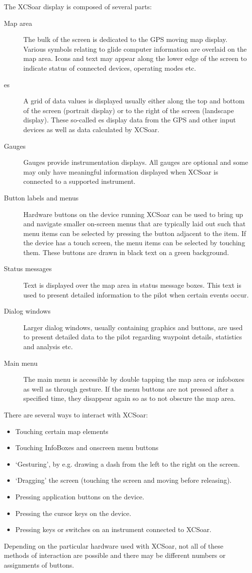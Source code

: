 \documentclass[a4paper,12pt]{refrep}
\begin{document}
The XCSoar display is composed of several parts:
\begin{description}
\item[Map area] The bulk of the screen is dedicated to the GPS moving map
display. Various symbols relating to glide computer information are overlaid 
on the map area. Icons and text may appear along the lower edge of the screen
to indicate status of connected devices, operating modes etc.
\item[{\InfoBox}es] A grid of data values is displayed usually either along
the top and bottom of the screen (portrait display) or to the right of the
screen (landscape display).  These so-called {\InfoBox}es display data from the
GPS and other input devices as well as data calculated by XCSoar.
\item[Gauges]  Gauges provide instrumentation displays. All gauges are optional
and some may only have meaningful information displayed when XCSoar is
connected to a supported instrument.
\item[Button labels and menus] Hardware buttons on the device running XCSoar
can be used to bring up and navigate smaller on-screen menus that are
typically laid out such that menu items can be selected by pressing the
button adjacent to the item.  If the device has a touch screen, the menu
items can be selected by touching them.  These buttons are drawn in black
text on a green background.
\item[Status messages] Text is displayed over the map area in status message
boxes.  This text is used to present detailed information to the pilot when
certain events occur.
\item[Dialog windows] Larger dialog windows, usually containing graphics and
buttons, are used to present detailed data to the pilot regarding waypoint
details, statistics and analysis etc.
\item[Main menu] The main menu is accessible by double tapping the map area or
infoboxes as well as through gesture. If the menu buttons are
not pressed after a specified time, they disappear again so as to not obscure the map area.
\end{description}

There are several ways to interact with XCSoar:
\begin{itemize}
\item Touching certain map elements
\item Touching InfoBoxes and onscreen menu buttons
\item `Gesturing', by e.g. drawing a dash from the left to the right on the screen.
\item `Dragging' the screen (touching the screen and moving before releasing).
\item Pressing application buttons on the device.
\item Pressing the cursor keys on the device.
\item Pressing keys or switches on an instrument connected to XCSoar.
\end{itemize}
Depending on the particular hardware used with XCSoar, not all of these methods
of interaction are possible and there may be different numbers or assignments
of buttons.
\end{document}
